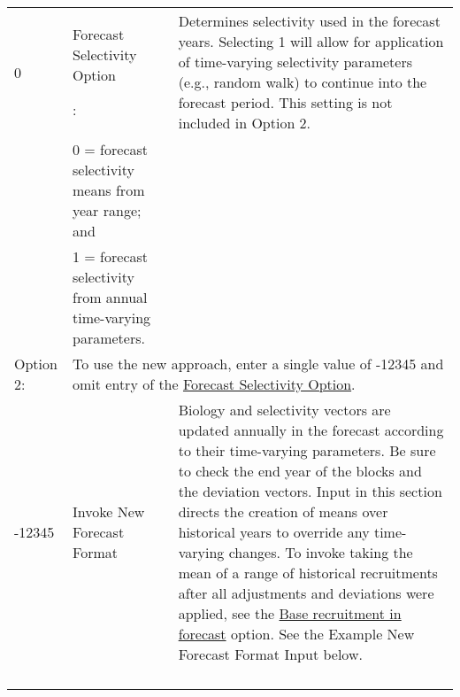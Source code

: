 \begin{landscape}
{\begin{longtable}{p{2cm} p{7cm} p{12cm}}
  0 & \hypertarget{FcastSelectivity}{Forecast Selectivity Option}: & \multirow{1}{1cm}[-0.15cm]{\parbox{12cm}{Determines selectivity used in the forecast years. Selecting 1 will allow for application of time-varying selectivity parameters (e.g., random walk) to continue into the forecast period. This setting is not included in Option 2.}} \\
    & 0 = forecast selectivity means from year range; and & \\
    & 1 = forecast selectivity from annual time-varying parameters. & \\

  Option 2: & \multicolumn{2}{l}{\multirow{1}{1cm}[-0.15cm]{\parbox{18.5cm}{To use the new approach, enter a single value of -12345 and omit entry of the \hyperlink{FcastSelectivity}{Forecast Selectivity Option}.}}} \Tstrut\Bstrut\\

  -12345 & Invoke New Forecast Format & \multirow{1}{1cm}[-0.15cm]{\parbox{12cm}{Biology and selectivity vectors are updated annually in the forecast according to their time-varying parameters. Be sure to check the end year of the blocks and the deviation vectors. Input in this section directs the creation of means over historical years to override any time-varying changes. To invoke taking the mean of a range of historical recruitments after all adjustments and deviations were applied, see the \hyperlink{FcastRecruitment}{Base recruitment in forecast} option. See the Example New Forecast Format Input below.}} \Tstrut\Bstrut\\
   & & \\
   & & \Tstrut\Bstrut\\
   & & \Tstrut\Bstrut\\
   & & \Tstrut\Bstrut\\
  

\end{longtable}}
\end{landscape}
